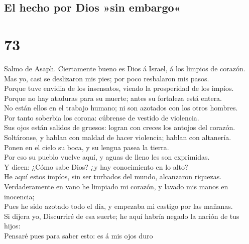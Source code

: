 \hypertarget{el-hecho-por-dios-sin-embargo}{%
\subsection{El hecho por Dios »sin
embargo«}\label{el-hecho-por-dios-sin-embargo}}

\hypertarget{section-19-73}{%
\section{73}\label{section-19-73}}

 Salmo de Asaph. Ciertamente bueno es Dios á Israel, á los
limpios de corazón.\\
 Mas yo, casi se deslizaron mis pies; por poco resbalaron
mis pasos.\\
 Porque tuve envidia de los insensatos, viendo la
prosperidad de los impíos.\\
 Porque no hay ataduras para su muerte; antes su fortaleza
está entera.\\
 No están ellos en el trabajo humano; ni son azotados con
los otros hombres.\\
 Por tanto soberbia los corona: cúbrense de vestido de
violencia.\\
 Sus ojos están salidos de gruesos: logran con creces los
antojos del corazón.\\
 Soltáronse, y hablan con maldad de hacer violencia;
hablan con altanería.\\
 Ponen en el cielo su boca, y su lengua pasea la tierra.\\
 Por eso su pueblo vuelve aquí, y aguas de lleno les son
exprimidas.\\
 Y dicen: ¿Cómo sabe Dios? ¿y hay conocimiento en lo
alto?\\
 He aquí estos impíos, sin ser turbados del mundo,
alcanzaron riquezas.\\
 Verdaderamente en vano he limpiado mi corazón, y lavado
mis manos en inocencia;\\
 Pues he sido azotado todo el día, y empezaba mi castigo
por las mañanas.\\
 Si dijera yo, Discurriré de esa suerte; he aquí habría
negado la nación de tus hijos:\\
 Pensaré pues para saber esto: es á mis ojos duro
